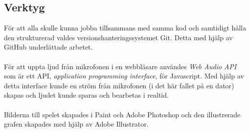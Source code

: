 \documentclass[12pt, titlepage, a4paper]{article}
\begin{document}
		\subsection{Verktyg}
			För att alla skulle kunna jobba tillsammans med samma kod och samtidigt hålla den strukturerad valdes versionshanteringssystemet Git. Detta med hjälp av GitHub underlättade arbetet.
			\\ \\
			För att uppta ljud från mikrofonen i en webbläsare användes \textit{Web Audio API}\cite{MDN} som är ett API, \textit{application programming interface}, för Javascript. Med hjälp av detta interface kunde en ström från mikrofonen (i det här fallet på en dator) skapas och ljudet kunde sparas och bearbetas i realtid.
			\\ \\
			Bilderna till spelet skapades i Paint och Adobe Photoshop och den illustrerade grafen skapades med hjälp av Adobe Illustrator.
\end{document}
